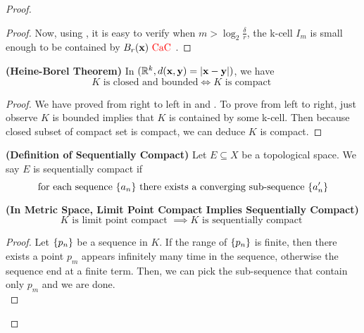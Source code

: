\documentclass{report}
\begin{document}
\begin{proof}
\begin{proof}
Now, using , it is easy to verify when  $m>\log_2 \frac{\delta}{r}$, the k-cell $I_m$ is small enough to be contained by $B_r(\textbf{x})\text{ \textcolor{red}{CaC} }$.
\end{proof}
\begin{corollary}
\label{1.12.5}
\textbf{(Heine-Borel Theorem)} In $(\mathbb{R}^k, d(\textbf{x},\textbf{y})=\left|\textbf{x}-\textbf{y}\right|)$, we have
\begin{equation}
K\text{ is closed and bounded}\iff K\text{ is compact }
\end{equation}
\end{corollary}
\begin{proof}
  We have proved from right to left in  and  . To prove from left to right, just observe $K$ is bounded implies that $K$ is contained by some k-cell. Then because closed subset of compact set is compact, we can deduce $K$ is compact.
\end{proof}
\begin{definition}
\label{1.12.6}
\textbf{(Definition of Sequentially Compact)} Let $E\subseteq X$ be a topological space. We say $E$ is sequentially compact if 
 \begin{equation}
\text{ for each sequence $\{ a_n \}$ there exists a converging sub-sequence $\{ a'_n \}$  }
\end{equation}
\end{definition}
\begin{theorem}
\label{1.12.7}
\textbf{(In Metric Space, Limit Point Compact Implies Sequentially Compact)} 
\begin{equation}
K\text{ is limit point compact }\implies K\text{ is sequentially compact }
\end{equation}
\end{theorem}
\begin{proof}
Let $\{ p_n \}$ be a sequence in $K$. If the range of $\{ p_n \}$ is finite, then there exists a point $p_m$ appears infinitely many time in the sequence, otherwise the sequence end at a finite term. Then, we can pick the sub-sequence that contain only $p_m$ and we are done. \\


\end{proof}
\end{proof}
\end{document}
